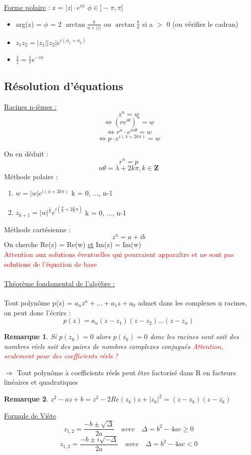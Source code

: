 \documentclass{article}
\newtheorem{remark}{Remarque}[section]
\begin{document}
\underline{Forme polaire} : z = \( |z|\cdot e^{i\phi} \) \qquad \qquad \qquad \( \phi \in ]-\pi, \pi]\)
\begin{itemize}
    \item arg(z) = \(\phi\) = 2 \( \arctan{\frac{b}{a + |z|}} \) ou \( \arctan{\frac{b}{a}}\) si a $>$ 0 (ou vérifier le cadran)
    \item \( z_1z_2 = |z_1||z_2|e^{i(\phi_1 + \phi_2)} \)
    \item \( \frac{1}{z} = \frac{1}{r}e^{-i\phi} \)
\end{itemize}
\subsection{Résolution d'équations}
\underline{Racines n-ièmes :}
\[ z^n = w\]
\[ \Leftrightarrow {(re^{i\theta})}^n = w\]
\[ \Leftrightarrow r^n \cdot e^{in\theta} = w\]
\[ \Leftrightarrow p \cdot e^{i(\lambda + 2k\pi)} = w\]

On en déduit :
\[ r^n = p \]
\[ n\theta = \lambda + 2k\pi, k \in \mathbf{Z} \]
Méthode polaire :
\begin{enumerate}
    \item \( w = |w|e^{i(\phi + 2k\pi)} \) \qquad \qquad \qquad k = 0, ..., n-1
    \item \( z_{k+1} = |w|^{\frac{1}{n}}e^{i(\frac{\phi}{n} + 2\frac{k}{n}\pi)} \) \qquad \qquad \qquad k = 0, ..., n-1
\end{enumerate}
Méthode cartésienne :
\[ z^n = a + ib \]
On cherche Re(z) = Re(w) \underline{et} Im(z) = Im(w) \\
\textcolor{red}{Attention aux solutions éventuelles qui pourraient apparaître et ne sont pas solutions de l'équation de base}
\\\\
\underline{Théorème fondamental de l'algèbre :} \\\\
Tout polynôme p(z) = \( a_nz^n+...+a_1z +a_0 \) admet dans les complexes n racines, on peut donc l'écrire :
\[ p(z) = a_n(z - z_1)(z - z_2)...(z - z_n)\]
\begin{remark}
    Si \(p(z_k) = 0\) alors \(p(\overline{z_k}) = 0\) donc les racines sont soit des nombres réels soit des paires de nombres complexes conjugués \textcolor{red}{Attention, seulement pour des coefficients réels !}
\end{remark}
\(\Rightarrow\) Tout polynôme à coefficients réels peut être factorisé dans R en facteurs linéaires et quadratiques
\begin{remark}
    \( z^2 - az + b = z^2 - 2Re(z_k)z + |z_k|^2 = (z - z_k)(z - \overline{z_k})\)
\end{remark}
\underline{Formule de Viète}
\[ z_{1,2} = \frac{-b \pm \sqrt{\Delta}}{2a} \quad avec \quad \Delta = b^2 - 4ac \geq 0\]
\[ z_{1,2} = \frac{-b \pm i\sqrt{-\Delta}}{2a} \quad avec \quad \Delta = b^2 - 4ac < 0\]
\end{document}
